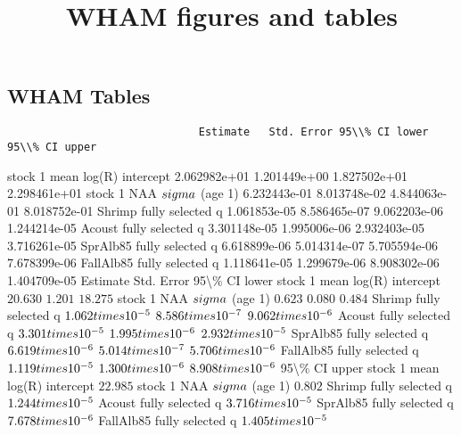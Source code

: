 \documentclass[
]{article}
\title{WHAM figures and tables}
\author{}
\date{\vspace{-2.5em}}
\begin{document}
\maketitle

\subsection{WHAM Tables}\label{wham-tables}

\begin{verbatim}
                              Estimate   Std. Error 95\\% CI lower 95\\% CI upper
\end{verbatim}

stock 1 mean log(R) intercept 2.062982e+01 1.201449e+00 1.827502e+01
2.298461e+01 stock 1 NAA \(\\sigma\) (age 1) 6.232443e-01 8.013748e-02
4.844063e-01 8.018752e-01 Shrimp fully selected q 1.061853e-05
8.586465e-07 9.062203e-06 1.244214e-05 Acoust fully selected q
3.301148e-05 1.995006e-06 2.932403e-05 3.716261e-05 SprAlb85 fully
selected q 6.618899e-06 5.014314e-07 5.705594e-06 7.678399e-06 FallAlb85
fully selected q 1.118641e-05 1.299679e-06 8.908302e-06 1.404709e-05
Estimate Std. Error 95\textbackslash\% CI lower stock 1 mean log(R)
intercept \(20.630\) \(1.201\) \(18.275\) stock 1 NAA \(\\sigma\) (age
1) \(0.623\) \(0.080\) \(0.484\) Shrimp fully selected q
\(1.062\\times 10^{-5}\) \(8.586\\times 10^{-7}\)
\(9.062\\times 10^{-6}\) Acoust fully selected q
\(3.301\\times 10^{-5}\) \(1.995\\times 10^{-6}\)
\(2.932\\times 10^{-5}\) SprAlb85 fully selected q
\(6.619\\times 10^{-6}\) \(5.014\\times 10^{-7}\)
\(5.706\\times 10^{-6}\) FallAlb85 fully selected q
\(1.119\\times 10^{-5}\) \(1.300\\times 10^{-6}\)
\(8.908\\times 10^{-6}\) 95\textbackslash\% CI upper stock 1 mean log(R)
intercept \(22.985\) stock 1 NAA \(\\sigma\) (age 1) \(0.802\) Shrimp
fully selected q \(1.244\\times 10^{-5}\) Acoust fully selected q
\(3.716\\times 10^{-5}\) SprAlb85 fully selected q
\(7.678\\times 10^{-6}\) FallAlb85 fully selected q
\(1.405\\times 10^{-5}\)
\end{document}
